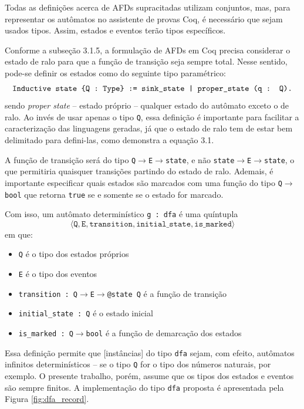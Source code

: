 Todas as definições acerca de AFDs supracitadas utilizam conjuntos, mas, para representar os autômatos no assistente de provas Coq, é necessário que sejam usados tipos. Assim, estados e eventos terão tipos específicos.

Conforme a subseção 3.1.5, a formulação de AFDs em Coq precisa considerar o estado de ralo para que a função de transição seja sempre total. Nesse sentido, pode-se definir os estados como do seguinte tipo paramétrico: $$\text{\texttt{Inductive state \{Q : Type\} := sink\_state | proper\_state (q : Q).}}$$ sendo \textit{proper state} -- estado próprio -- qualquer estado do autômato exceto o de ralo. Ao invés de usar apenas o tipo \texttt{Q}, essa definição é importante para facilitar a caracterização das linguagens geradas, já que o estado de ralo tem de estar bem delimitado para defini-las, como demonstra a equação 3.1.

A função de transição será do tipo \texttt{Q$\rightarrow$E$\rightarrow$state}, e não \texttt{state$\rightarrow$E$\rightarrow$state}, o que permitiria quaisquer transições partindo do estado de ralo. Ademais, é importante especificar quais estados são marcados com uma função do tipo \texttt{Q$\rightarrow$bool} que retorna \texttt{true} se e somente se o estado for marcado.

Com isso, um autômato determinístico \texttt{g : dfa} é uma quíntupla $$\langle\texttt{Q}, \texttt{E}, \texttt{transition}, \texttt{initial\_state}, \texttt{is\_marked}\rangle$$ em que: \begin{itemize}[label={}]
	\item \texttt{Q} é o tipo dos estados próprios
	\item \texttt{E} é o tipo dos eventos
	\item  \texttt{transition : Q$\rightarrow$E$\rightarrow$@state Q} é a função de transição
	\item \texttt{initial\_state : Q} é o estado inicial
	\item \texttt{is\_marked : Q$\rightarrow$bool} é a função de demarcação dos estados
\end{itemize}

Essa definição permite que [instâncias] do tipo \texttt{dfa} sejam, com efeito, autômatos infinitos determinísticos -- se o tipo \texttt{Q} for o tipo dos números naturais, por exemplo. O presente trabalho, porém, assume que os tipos dos estados e eventos são sempre finitos. A implementação do tipo \texttt{dfa} proposta é apresentada pela Figura \ref{fig:dfa_record}.

